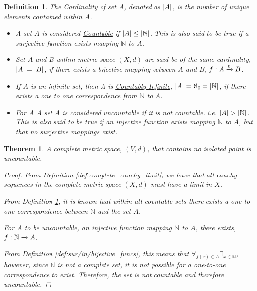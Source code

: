 \documentclass[]{article}
\newcommand{\N}{\mathbb{N}}
\newcommand{\toI}{\xrightarrow{\textsf{\tiny I}}}
\newcommand{\toB}{\xrightarrow{\textsf{\tiny B}}}
\newtheorem{definition}{Definition}
\newtheorem{theorem}{Theorem}
\begin{document}
\begin{definition}\label{def:cardinalityAndCountable}
    The \emph{\underline{Cardinality}} of set $A$,
        denoted as $\abs{A}$,
        is the number of unique elements contained within $A$.
    \begin{itemize}
        \item A set $A$ is considered \emph{\underline{Countable}} if $\abs{A} \leq \abs{\N}$. 
        This is also said to be true if a surjective function exists mapping $\N$ to $A$.
        
        \item Set $A$ and $B$ within metric space $(X,d)$ are said be of the same cardinality,
        $\abs{A}=\abs{B}$, 
        if there exists a bijective mapping between $A$ and $B$, $f : A \toB B$.

        \item If $A$ is an infinite set, then $A$ is \emph{\underline{Countably Infinite}},
        $\abs{A} = \aleph_0 = \abs{\N}$, 
        if there exists a one to one correspondence from $\N$ to $A$.
        
        \item For $A$ A set $A$ is considered \emph{\underline{uncountable}} if it is not countable.
        i.e. $\abs{A} > \abs{\N}$. 
        This is also said to be true if an injective function exists mapping $\N$ to $A$, 
        but that no surjective mappings exist.
    \end{itemize}
\end{definition}

\begin{theorem}
    A complete metric space, $(V,d)$, that contains no isolated point is uncountable.
    \begin{proof}
        From Definition \ref{def:complete_cauchy_limit}, 
        we have that all cauchy sequences in the complete metric space $(X,d)$ must have a limit in $X$.
        
        From Definition \ref{def:cardinalityAndCountable}, 
        it is known that within all countable sets there exists a one-to-one correspondence between $\N$ and the set $A$.
        
        For $A$ to be uncountable, an injective function mapping $\N$ to $A$, there exists, $f : \N \toI A$. 

        From Definition \ref{def:sur/in/bijective_funcs}, this means that 
        $\forall_{f(x) \in A} \exists_{x \in \N}$,
        however, since $\N$ is not a complete set, it is not possible for a one-to-one correspondence to exist.
        Therefore, the set is not countable and therefore uncountable.
    \end{proof}
\end{theorem}
\end{document}
